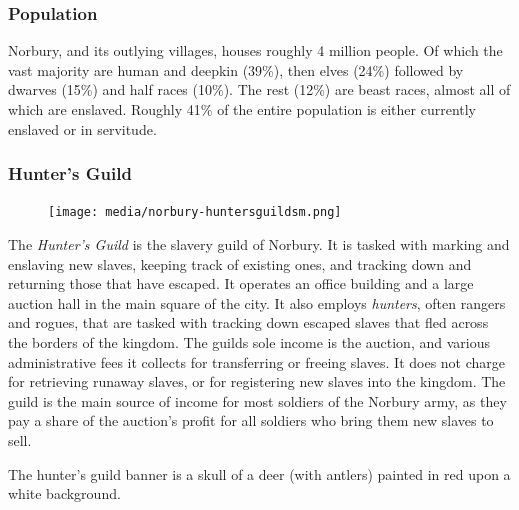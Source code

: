 \subsubsection{Population}

Norbury, and its outlying villages, houses roughly 4 million people. Of which
the vast majority are human and deepkin (39\%), then elves (24\%) followed by
dwarves (15\%) and half races (10\%). The rest (12\%) are beast races, almost
all of which are enslaved. Roughly 41\% of the entire population is either
currently enslaved or in servitude.

\subsubsection{Hunter's Guild}
\label{sec:Hunters Guild}

\begin{figure}[!ht]
  \centering
  \texttt{[image: media/norbury-huntersguildsm.png]}
\end{figure}

The \emph{Hunter's Guild} is the slavery guild of Norbury. It is tasked with
marking and enslaving new slaves, keeping track of existing ones, and tracking
down and returning those that have escaped. It operates an office building and
a large auction hall in the main square of the city. It also employs
\emph{hunters}, often rangers and rogues, that are tasked with tracking down
escaped slaves that fled across the borders of the kingdom. The guilds sole
income is the auction, and various administrative fees it collects for
transferring or freeing slaves. It does not charge for retrieving runaway
slaves, or for registering new slaves into the kingdom. The guild is the main
source of income for most soldiers of the Norbury army, as they pay a share of
the auction's profit for all soldiers who bring them new slaves to sell.

The hunter's guild banner is a skull of a deer (with antlers) painted in red
upon a white background.
